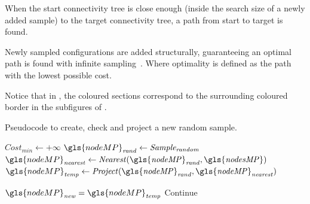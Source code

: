 When the start connectivity tree is close enough (inside the search size of a newly added sample) to the target connectivity tree, a path from start to target is found. 


Newly sampled configurations are added structurally, guaranteeing an optimal path is found with infinite sampling~\cite{chen_fast_2018}. Where optimality is defined as the path with the lowest possible cost.\bs


Notice that in , the coloured sections correspond to the surrounding coloured border in the subfigures of .\bs


\begin{algorithm}[H]
\caption{Pseudocode to create, check and project a new random sample.}%
\label{pseudocode:proposed_rrt_star_one}
\begin{algorithmic}[1]
  \hspace{-0.9cm}\colorbox{my_light_blue}{\parbox{\linewidth}{%
    \State $Cost_\mathit{min} \leftarrow +\infty$ 
    \State $\gls{nodeMP}_\mathit{rand} \leftarrow \mathit{Sample_{random}}$
    \State $\gls{nodeMP}_\mathit{nearest} \leftarrow \mathit{Nearest(\gls{nodeMP}_{rand}, \gls{nodesMP})}$
    \State $\gls{nodeMP}_\mathit{temp} \leftarrow \mathit{Project(\gls{nodeMP}_{rand}, \gls{nodeMP}_{nearest})}$

    \State $\gls{nodeMP}_\mathit{new} = \gls{nodeMP}_\mathit{temp}$
    \Else
        \State Continue
    \EndIf
}}
\end{algorithmic}
\end{algorithm}

